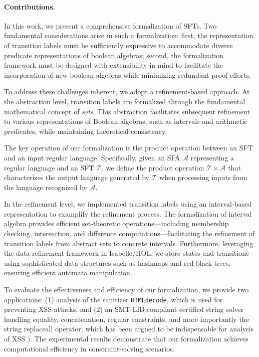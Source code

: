 \paragraph{Contributions.} 
In this work, we present a comprehensive formalization of SFTs. 
Two fundamental considerations arise in such a formalization: first, the 
representation of transition labels must be sufficiently expressive to accommodate diverse predicate representations of boolean algebras; second, the formalization framework must be designed with extensibility in mind to facilitate the incorporation of new boolean algebras while minimizing redundant proof efforts.

To address these challenges inherent, %
we adopt a refinement-based approach. At the abstraction level, transition labels are formalized through the fundamental mathematical concept of \emph{sets}. This abstraction facilitates subsequent refinement to various representations of Boolean algebras, such as intervals and arithmetic predicates, while maintaining theoretical consistency.

The key operation of our formalization is the product operation between an SFT and an input regular language. Specifically, given an SFA $\mathcal{A}$ representing a regular language and an SFT $\mathcal{T}$, we define the product operation $\mathcal{T} \times\mathcal{A}$ that characterizes the output language generated by $\mathcal{T}$ when processing inputs from the language recognized by $\mathcal{A}$.


In the refinement level, we implemented transition labels using an interval-based representation to examplify the refinement process. The formalization of interval algebra provides efficient set-theoretic operations—including membership checking, intersection, and difference computations—facilitating the refinement of transition labels from abstract sets to concrete intervals. Furthermore, leveraging the data refinement framework \cite{DBLP:conf/itp/Lammich13} in Isabelle/HOL, we store states and transitions using sophisticated data structures such as hashmaps and red-black trees, ensuring efficient automata manipulation.

To evaluate the effectiveness and efficiency of our formalization, we 
provide two applications: (1) analysis of the sanitizer \texttt{HTMLdecode},
which is used for preventing XSS attacks, and (2) an SMT-LIB \cite{smtlib}
compliant certified string solver handling equality, concatenation, regular
constraints, and more importantly the string replaceall operator, which has been
argued to be indispensable for analysis of XSS 
\cite{DBLP:conf/popl/LinB16,Kern,Berkeley-JavaScript,DBLP:conf/sp/SaxenaAHMMS10,uss/HooimeijerLMSV11}).
The experimental results demonstrate that our formalization achieves computational efficiency in constraint-solving scenarios.

